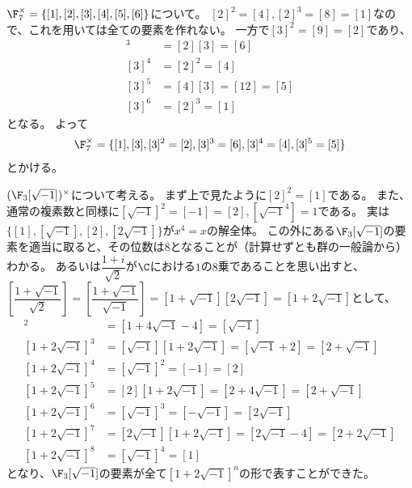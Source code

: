 \documentclass[uplatex]{jsarticle}
\begin{document}
\begin{eg}
  $\F_7^\times=\{[1],[2],[3],[4],[5],[6]\}$について。
  $[2]^2=[4], [2]^3=[8]=[1]$なので、これを用いては全ての要素を作れない。
  一方で$[3]^2=[9]=[2]$であり、
  \begin{align*}
    [3]^3&=[2][3]=[6]\\
    [3]^4&=[2]^2=[4]\\
    [3]^5&=[4][3]=[12]=[5]\\
    [3]^6&=[2]^3=[1]
  \end{align*}
  となる。
  よって
  \begin{align*}
    \F_7^\times=\{[1],[3],[3]^2=[2],[3]^3=[6],[3]^4=[4],[3]^5=[5]\}
  \end{align*}
  とかける。
\end{eg}

\begin{eg}
  $(\F_3[\sqrt{-1}])^\times$について考える。
  まず上で見たように$[2]^2=[1]$である。
  また、通常の複素数と同様に$[\sqrt{-1}]^2=[-1]=[2], [\sqrt{-1}^4]=1$である。
  実は$\{[1],[\sqrt{-1}],[2],[2\sqrt{-1}]\}$が$x^4=x$の解全体。
  この外にある$\F_3[\sqrt{-1}]$の要素を適当に取ると、その位数は$8$となることが（計算せずとも群の一般論から）わかる。
  あるいは$\dfrac{1+i}{\sqrt{2}}$が$\C$における$1$の$8$乗であることを思い出すと、
  $[\dfrac{1+\sqrt{-1}}{\sqrt{2}}]=[\dfrac{1+\sqrt{-1}}{\sqrt{-1}}]=[1+\sqrt{-1}][2\sqrt{-1}]=[1+2\sqrt{-1}]$として、
  \begin{align*}
    [1+2\sqrt{-1}]^2&=[1+4\sqrt{-1}-4]=[\sqrt{-1}]\\
    [1+2\sqrt{-1}]^3&=[\sqrt{-1}][1+2\sqrt{-1}]=[\sqrt{-1}+2]=[2+\sqrt{-1}]\\
    [1+2\sqrt{-1}]^4&=[\sqrt{-1}]^2=[-1]=[2]\\
    [1+2\sqrt{-1}]^5&=[2][1+2\sqrt{-1}]=[2+4\sqrt{-1}]=[2+\sqrt{-1}]\\
    [1+2\sqrt{-1}]^6&=[\sqrt{-1}]^3=[-\sqrt{-1}]=[2\sqrt{-1}]\\
    [1+2\sqrt{-1}]^7&=[2\sqrt{-1}][1+2\sqrt{-1}]=[2\sqrt{-1}-4]=[2+2\sqrt{-1}]\\
    [1+2\sqrt{-1}]^8&=[\sqrt{-1}]^4=[1]
  \end{align*}
  となり、$\F_3[\sqrt{-1}]$の要素が全て$[1+2\sqrt{-1}]^n$の形で表すことができた。
\end{eg}
\end{document}
